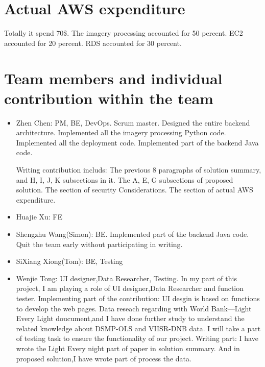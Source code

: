 \documentclass[conference]{IEEEtran}
\begin{document}
\section{Actual AWS expenditure}

Totally it spend 70\$. The imagery processing accounted for 50 percent. EC2 accounted for 20 percent. RDS accounted for 30 percent.

\section{Team members and individual contribution within the team}
\begin{itemize}
    \item Zhen Chen: PM, BE, DevOps. Scrum master. Designed the entire backend architecture. Implemented all the imagery processing Python code. Implemented all the deployment code. 
    Implemented part of the backend Java code. 
    
    Writing contribution includs: The previous 8 paragraphs of solution summary, and H, I, J, K subsections in it. The A, E, G subsections of proposed solution. The section of security Considerations. The section of actual AWS expenditure.

    \item Huajie Xu: FE
    \item Shengzhu Wang(Simon): BE. Implemented part of the backend Java code. Quit the team early without participating in writing.
    \item SiXiang Xiong(Tom): BE, Testing
    \item Wenjie Tong: UI designer,Data Researcher, Testing.
    In my part of this project, I am playing a role of UI designer,Data Researcher and function tester. 
    Implementing part of the contribution:
    UI desgin is based on functions to develop the web pages.
    Data reseach regarding with World Bank---Light Every Light doucument,and I have done further study to understand the related knowledge about DSMP-OLS and VIISR-DNB data.
    I will take a part of testing task to ensure the functionality of our project.
    Writing part:
    I have wrote the Light Every night part of paper in solution summary. And in proposed solution,I have wrote part of process the data.
    
\end{itemize}
  
\printbibliography
\end{document}
